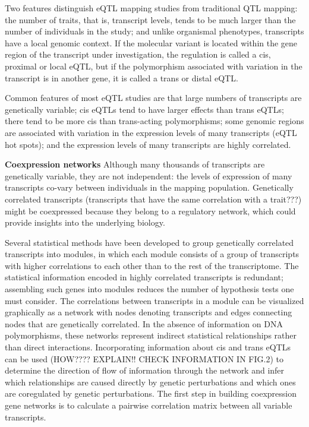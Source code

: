 \documentclass[a4paper,10pt]{article}
\begin{document}
\begin{description}
\begin{description}
Two features distinguish eQTL mapping studies from traditional QTL mapping:
the number of traits, that is, transcript levels, tends to be much larger than the number of individuals in the study;
and unlike organismal phenotypes, transcripts have a local genomic context. If the molecular variant is located within the gene region of the transcript under investigation, the regulation is called a cis, proximal or local eQTL, but if the polymorphism associated with variation in the
transcript is in another gene, it is called a trans or distal eQTL.

Common features of most eQTL studies are that large numbers of transcripts are genetically variable; cis eQTLs tend to have larger effects than trans eQTLs; there tend to be more cis than trans-acting polymorphisms; 
some genomic regions are associated with variation in the expression levels of many transcripts (eQTL hot spots); and the expression levels of many transcripts are highly correlated.

\textbf{Coexpression networks} Although many thousands of transcripts are genetically variable, they are not independent: the levels of expression of many transcripts co-vary between individuals in the mapping population.
Genetically correlated transcripts (transcripts that have the same correlation with a trait???) might be coexpressed because they belong to a regulatory network, which could provide insights into the underlying biology.

Several statistical methods have been developed to group genetically correlated transcripts into modules, in which each module consists of a group of transcripts with higher correlations to each other than to the rest of the transcriptome.
The statistical information encoded in highly correlated transcripts is redundant; assembling such genes into modules reduces the number of hypothesis tests one must consider. 
The correlations between transcripts in a module can be visualized graphically as a network with nodes denoting transcripts and edges connecting nodes that are genetically correlated.
In the absence of information on DNA polymorphisms, these networks represent indirect statistical relationships rather than direct interactions. 
Incorporating information about cis and trans eQTLs can be used (HOW???? EXPLAIN!! CHECK INFORMATION IN FIG.2) to determine the direction of flow of information through the network and infer which relationships are caused directly by genetic perturbations and which ones are coregulated by genetic
perturbations.
The first step in building coexpression gene networks is to calculate a pairwise correlation matrix between all variable transcripts.


\end{description}
\end{description}
\end{document}
